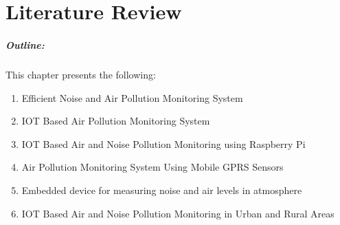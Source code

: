 \chapter{Literature Review}
\label{chap2}


\vspace*{45 ex}



\paragraph*{Outline:} This chapter presents the following:
\begin{enumerate}
\setlength{\itemsep}{-0.3em}
\item Efficient Noise and Air Pollution Monitoring System
\item IOT Based Air Pollution Monitoring System 
\item IOT Based Air and Noise Pollution Monitoring using Raspberry Pi
\item Air Pollution Monitoring System Using Mobile GPRS Sensors
\item Embedded device for measuring noise and air levels in atmosphere
\item IOT Based Air and Noise Pollution Monitoring in Urban and Rural Areas
\end{enumerate}


\newpage

